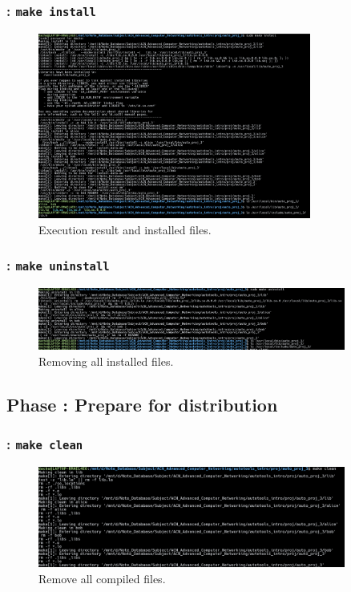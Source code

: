\begin{frame}
    \frametitle{: \texttt{make install}}

    \begin{figure}[H]
        \centering
        \includegraphics[width=0.8\textwidth]{../figure/autotool_8.png}
        \caption*{Execution result and installed files.}
    \end{figure}
\end{frame}

\begin{frame}
    \frametitle{: \texttt{make uninstall}}

    \begin{figure}[H]
        \centering
        \includegraphics[width=0.9\textwidth]{../figure/autotool_9.png}
        \caption*{Removing all installed files.}
    \end{figure}
\end{frame}

\subsection{Phase : Prepare for distribution}

\begin{frame}
    \frametitle{: \texttt{make clean}}

    \begin{figure}[H]
        \centering
        \includegraphics[width=0.9\textwidth]{../figure/autotool_10.png}
        \caption*{Remove all compiled files.}
    \end{figure}
\end{frame}

